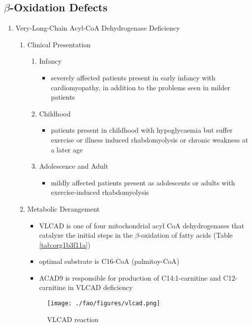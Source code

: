 \documentclass{scrartcl}
\begin{document}
\subsection{\(\beta\)-Oxidation Defects}
\label{sec:org52c0d43}
\begin{enumerate}
\item Very-Long-Chain Acyl-CoA Dehydrogenase Deficiency
\label{sec:org5db2292}
\begin{enumerate}
\item Clinical Presentation
\label{sec:orgb5bd8b3}
\begin{enumerate}
\item Infancy
\label{sec:org0519093}
\begin{itemize}
\item severely affected patients present in early infancy with
cardiomyopathy, in addition to the problems seen in milder patients
\end{itemize}
\item Childhood
\label{sec:org1e6a908}
\begin{itemize}
\item patients present in childhood with hypoglycaemia but suffer exercise
or illness induced rhabdomyolysis or chronic weakness at a later age
\end{itemize}
\item Adolescence and Adult
\label{sec:orgac687cc}
\begin{itemize}
\item mildly affected patients present as adolescents or adults with
exercise-induced rhabdomyolysis
\end{itemize}
\end{enumerate}
\item Metabolic Derangement
\label{sec:orgd75d7b2}
\begin{itemize}
\item VLCAD is one of four mitochondrial acyl CoA dehydrogenases that
catalyze the initial steps in the \(\beta\)-oxidation of fatty acids
(Table \ref{tab:org1b3f11a})
\item optimal substrate is C16-CoA (palmitoy-CoA)
\item ACAD9 is responsible for production of C14:1-carnitine and
C12-carnitine in VLCAD deficiency
\end{itemize}
\begin{figure}[htbp]
\centering
\texttt{[image: ./fao/figures/vlcad.png]}
\caption{\label{fig:org5a3ccb6}
VLCAD reaction}
\end{figure}


\end{enumerate}
\end{enumerate}
\end{document}
